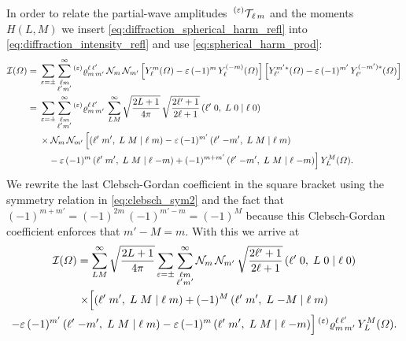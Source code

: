 In order to relate the partial-wave
amplitudes~$\prescript{(\ensuremath{\varepsilon})}{}{\ensuremath{\mathcal{T}}}_{\!\ell\, m}$ and the
moments~$H(L, M)$ we insert \cref{eq:diffraction_spherical_harm_refl}
into \cref{eq:diffraction_intensity_refl} and use
\cref{eq:spherical_harm_prod}:
\begin{align}
  \intensity(\Omega)
  ={}&
    \sum_{\refl = \pm} \sum_{\substack{\ell m \\ \ell' m'}}^\infty
    \prescript{(\refl)}{}{\varrho}^{\ell\, \ell'}_{m\, m'}\,
    \mathcal{N}_m\, \mathcal{N}_{m'}
    \sBrk[2]{Y_\ell^m(\Omega) - \refl\, (-1)^m\, Y_\ell^{(-m)}(\Omega)}
    \sBrk[2]{Y_{\ell'}^{m' *}(\Omega) - \refl\, (-1)^{m'}\, Y_{\ell'}^{(-m') *}(\Omega)}
  \\
  ={}& \begin{multlined}[t][0.85\columnwidth]
    \sum_{\refl = \pm} \sum_{\substack{\ell m \\ \ell' m'}}^\infty
    \prescript{(\refl)}{}{\varrho}^{\ell\, \ell'}_{m\, m'}\,
    \sum_{L M}^\infty \sqrt{\frac{2 L + 1}{4 \pi}}\, \sqrt{\frac{2 \ell' + 1}{2 \ell + 1}}\, \clebsch{\ell'}{0}{L}{0}{\ell}{0} \\
    \shoveleft{\times \mathcal{N}_m\, \mathcal{N}_{m'}\, \Big[ \clebsch{\ell'}{m'}{L}{M}{\ell}{m}                       - \refl\, (-1)^{m'}\, \clebsch{\ell'}{-m'}{L}{M}{\ell}{m}} \\
      - \refl\, (-1)^m\, \clebsch{\ell'}{m'}{L}{M}{\ell}{-m} + (-1)^{m + m'}\, \clebsch{\ell'}{-m'}{L}{M}{\ell}{-m} \Big]\,
    Y_L^M(\Omega).
  \end{multlined}
\end{align}
We rewrite the last Clebsch-Gordan coefficient in the square bracket
using the symmetry relation in \cref{eq:clebsch_sym2} and the fact
that $(-1)^{m + m'} = (-1)^{2m}\, (-1)^{m' - m} = (-1)^M$ because this
Clebsch-Gordan coefficient enforces that $m' - M = m$.  With this we
arrive at
\begin{multline}
  \mathcal{I}(\Omega)
  = \sum_{L M}^\infty \sqrt{\frac{2 L + 1}{4 \pi}}
  \sum_{\varepsilon = \pm} \sum_{\substack{\ell m \\ \ell' m'}}^\infty
  \mathcal{N}_m\, \mathcal{N}_{m'}\,
  \sqrt{\frac{2 \ell' + 1}{2 \ell + 1}}\,
  ({\ell'}\;{0},\;{L}\;{0}\; |\; {\ell}\;{0})
  \\
  \times \Big[
    ({\ell'}\;{m'},\;{L}\;{M}\; |\; {\ell}\;{m})
    + (-1)^M\, ({\ell'}\;{m'},\;{L}\;{-M}\; |\; {\ell}\;{m}) \\
    - \varepsilon\, (-1)^{m'}\, ({\ell'}\;{-m'},\;{L}\;{M}\; |\; {\ell}\;{m})
    - \varepsilon\, (-1)^m\, ({\ell'}\;{m'},\;{L}\;{M}\; |\; {\ell}\;{-m}) \Big]
  \prescript{(\ensuremath{\varepsilon})}{}{\varrho}^{\ell\, \ell'}_{m\, m'}\,
  Y_L^M(\Omega).
\end{multline}
